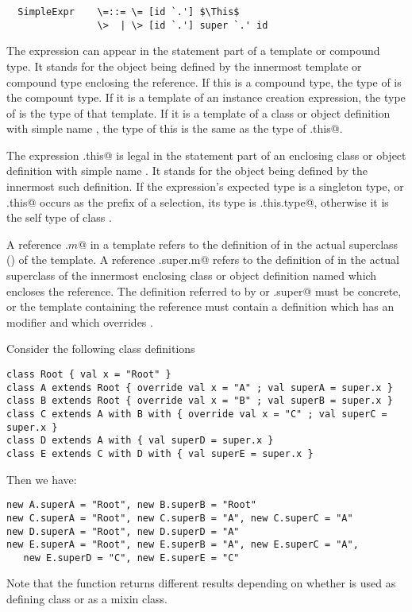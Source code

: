 \documentclass[11pt]{report}
\begin{document}
\syntax\begin{verbatim}
  SimpleExpr    \=::= \= [id `.'] $\This$
                \>  | \> [id `.'] super `.' id
\end{verbatim}

The expression \verb@this@ can appear in the statement part of a
template or compound type. It stands for the object being defined by
the innermost template or compound type enclosing the reference. If
this is a compound type, the type of \verb@this@ is the compount type.
If it is a template of an instance creation expression, the type of
\verb@this@ is the type of that template. If it is a template of a
class or object definition with simple name \verb@C@, the type of this
is the same as the type of \verb@C.this@.

The expression \verb@C.this@ is legal in the statement part of an
enclosing class or object definition with simple name \verb@C@. It
stands for the object being defined by the innermost such definition.
If the expression's expected type is a singleton type, or
\verb@C.this@ occurs as the prefix of a selection, its type is
\verb@C.this.type@, otherwise it is the self type of class \verb@C@.

A reference \verb@super.$m$@ in a template refers to the definition of
\verb@m@ in the actual superclass () of the
template.  A reference \verb@C.super.m@ refers to the definition of
\verb@m@ in the actual superclass of the innermost enclosing class or
object definition named \verb@C@ which encloses the reference. The
definition referred to by \verb@super@ or \verb@C.super@ must be
concrete, or the template containing the reference must contain a
definition which has an \verb@override@ modifier and which overrides
\verb@m@.

\example\label{ex:super}
Consider the following class definitions

\begin{verbatim}
class Root { val x = "Root" }
class A extends Root { override val x = "A" ; val superA = super.x }
class B extends Root { override val x = "B" ; val superB = super.x }
class C extends A with B with { override val x = "C" ; val superC = super.x }
class D extends A with { val superD = super.x }
class E extends C with D with { val superE = super.x }
\end{verbatim}
Then we have:
\begin{verbatim}
new A.superA = "Root", new B.superB = "Root"
new C.superA = "Root", new C.superB = "A", new C.superC = "A"
new D.superA = "Root", new D.superD = "A"
new E.superA = "Root", new E.superB = "A", new E.superC = "A",
   new E.superD = "C", new E.superE = "C"
\end{verbatim}
Note that the \verb@superB@ function returns different results
depending on whether \verb@B@ is used as defining class or as a mixin class.
\end{document}
